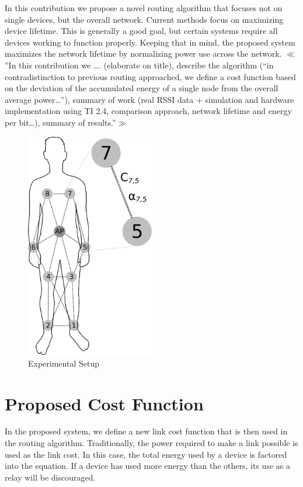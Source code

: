\documentclass{article}
\begin{document}
In this contribution we propose a novel routing algorithm that focuses not on single devices, but the overall network. Current methods focus on maximizing device lifetime. This is generally a good goal, but certain systems require all devices working to function properly. Keeping that in mind, the proposed system maximizes the network lifetime by normalizing power use across the network.
$\ll$”In this contribution we …. (elaborate on title), describe the algorithm (“in contradistinction to previous routing approached, we define a cost function based on the deviation of the accumulated energy of a single node from the overall average power…”), summary of work (real RSSI data + simulation and hardware implementation using TI 2.4, comparison approach, network lifetime and energy per bit…), summary of results.”$\gg$ 

\begin{figure}[htb]
\begin{center}
\includegraphics[width=0.5\textwidth]{figures/body.pdf}
\end{center}
\caption{Experimental Setup}
\label{fig:body}
\end{figure}

\section{Proposed Cost Function}
In the proposed system, we define a new link cost function that is then used in the routing algorithm. Traditionally, the power required to make a link possible is used as the link cost. In this case, the total energy used by a device is factored into the equation. If a device has used more energy than the others, its use as a relay will be discouraged.
\end{document}
